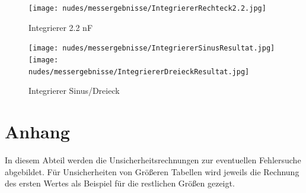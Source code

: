 \documentclass[12pt,a4paper,twoside]{article}
\begin{document}
\begin{figure}[H]
    \centering
    \texttt{[image: nudes/messergebnisse/IntegriererRechteck2.2.jpg]}
    \caption{Integrierer 2.2 nF}
    \label{fig:IntegriererResultat2AW}
\end{figure}

\begin{figure}[H]
    \centering
    \texttt{[image: nudes/messergebnisse/IntegriererSinusResultat.jpg]}
    \texttt{[image: nudes/messergebnisse/IntegriererDreieckResultat.jpg]}
    \caption{Integrierer Sinus/Dreieck}
    \label{fig:IntegriererResultat3AW}
\end{figure}


\section{Anhang}

In diesem Abteil werden die Unsicherheitsrechnungen zur eventuellen Fehlersuche abgebildet. Für Unsicherheiten von Größeren Tabellen wird jeweils die Rechnung des ersten Wertes als Beispiel für die restlichen Größen gezeigt.


\printbibliography[heading=bibintoc]
\end{document}
